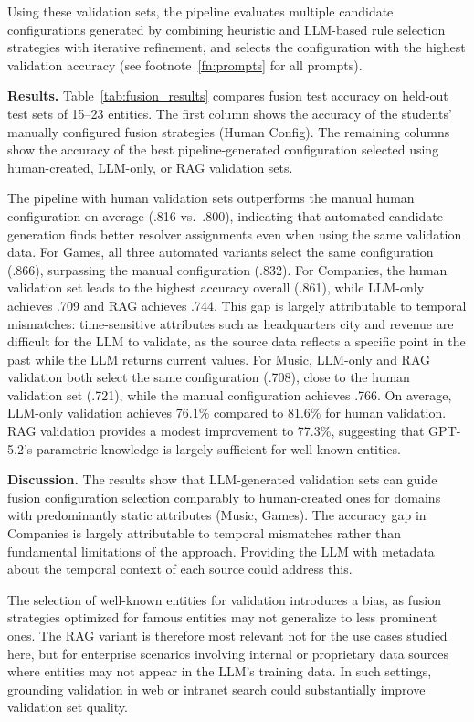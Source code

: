 Using these validation sets, the pipeline evaluates multiple candidate configurations generated by combining heuristic and LLM-based rule selection strategies with iterative refinement, and selects the configuration with the highest validation accuracy (see footnote~\ref{fn:prompts} for all prompts).

\textbf{Results.}\label{sec:fusion_results} Table~\ref{tab:fusion_results} compares fusion test accuracy on held-out test sets of 15--23 entities. The first column shows the accuracy of the students' manually configured fusion strategies (Human Config). The remaining columns show the accuracy of the best pipeline-generated configuration selected using human-created, LLM-only, or RAG validation sets.



The pipeline with human validation sets outperforms the manual human configuration on average (.816 vs.\ .800), indicating that automated candidate generation finds better resolver assignments even when using the same validation data. For Games, all three automated variants select the same configuration (.866), surpassing the manual configuration (.832). For Companies, the human validation set leads to the highest accuracy overall (.861), while LLM-only achieves .709 and RAG achieves .744. This gap is largely attributable to temporal mismatches: time-sensitive attributes such as headquarters city and revenue are difficult for the LLM to validate, as the source data reflects a specific point in the past while the LLM returns current values. For Music, LLM-only and RAG validation both select the same configuration (.708), close to the human validation set (.721), while the manual configuration achieves .766. On average, LLM-only validation achieves 76.1\% compared to 81.6\% for human validation. RAG validation provides a modest improvement to 77.3\%, suggesting that GPT-5.2's parametric knowledge is largely sufficient for well-known entities.

\textbf{Discussion.}\label{sec:fusion_discussion}
The results show that LLM-generated validation sets can guide fusion configuration selection comparably to human-created ones for domains with predominantly static attributes (Music, Games). The accuracy gap in Companies is largely attributable to temporal mismatches rather than fundamental limitations of the approach. Providing the LLM with metadata about the temporal context of each source could address this.

The selection of well-known entities for validation introduces a bias, as fusion strategies optimized for famous entities may not generalize to less prominent ones. The RAG variant is therefore most relevant not for the use cases studied here, but for enterprise scenarios involving internal or proprietary data sources where entities may not appear in the LLM's training data. In such settings, grounding validation in web or intranet search could substantially improve validation set quality.

